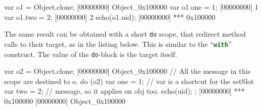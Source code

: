 \begin{urbiscript}[firstnumber=last]
var o1 = Object.clone;
[00000000] Object_0x100000
var o1.one = 1;
[00000000] 1
var o1.two = 2;
[00000000] 2
echo(o1.uid);
[00000000] *** 0x100000
\end{urbiscript}

The same result can be obtained with a short \lstinline|do| scope,
that redirect method calls to their target, as in the listing
below. This is similar to the \pascal
``\lstinline[language=Pascal]{with}'' construct.  The value of the
\lstinline{do}-block is the target itself.

\begin{urbiscript}[firstnumber=last]
var o2 = Object.clone;
[00000000] Object_0x100000
// All the message in this scope are destined to o.
do (o2)
{
  var one = 1; // var is a shortcut for the setSlot
  var two = 2; // message, so it applies on obj too.
  echo(uid);
};
[00000000] *** 0x100000
[00000000] Object_0x100000
\end{urbiscript}



